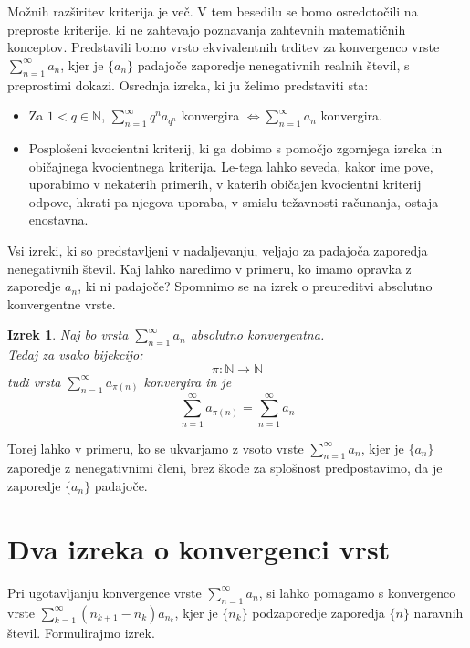 \documentclass[a4paper,12pt]{article}
\def\N{\mathbb{N}} %
\newtheorem{izrek}{Izrek}
\begin{document}
Možnih razširitev kriterija je več. V tem besedilu se bomo osredotočili na preproste kriterije, ki ne
zahtevajo poznavanja zahtevnih matematičnih konceptov. Predstavili bomo vrsto ekvivalentnih trditev
za konvergenco vrste $\sum_{n = 1}^{\infty}{a_n}$, kjer je $\{a_n\}$ padajoče zaporedje nenegativnih realnih števil, s preprostimi dokazi. Osrednja
izreka, ki ju želimo predstaviti sta:

\begin{itemize}
    \item Za $ 1 < q \in \N$, $\sum_{n = 1}^{\infty}{q^na_{q^n}}$ konvergira $\iff \sum_{n = 1}^{\infty}{a_{n}}$ konvergira.
    \item Posplošeni kvocientni kriterij, ki ga dobimo s pomočjo zgornjega izreka in običajnega kvocientnega kriterija.
    Le-tega lahko seveda, kakor ime pove, uporabimo v nekaterih primerih, v katerih običajen kvocientni kriterij odpove, 
    hkrati pa njegova uporaba, v smislu težavnosti računanja, ostaja enostavna.
\end{itemize}


Vsi izreki, ki so predstavljeni v nadaljevanju, veljajo za padajoča zaporedja nenegativnih števil.
Kaj lahko naredimo v primeru, ko imamo opravka z zaporedje $a_n$, ki ni padajoče?
Spomnimo se na izrek o preureditvi absolutno konvergentne vrste.

\begin{izrek}
    Naj bo vrsta $\sum_{n = 1}^{\infty}{a_n}$ absolutno konvergentna.\\
    Tedaj za vsako bijekcijo:
    \[\pi: \N \rightarrow \N \]
    tudi vrsta $\sum_{n = 1}^{\infty}{a_{\pi(n)}}$ konvergira in je 
    \[
        \sum_{n = 1}^{\infty}{a_{\pi(n)}} = \sum_{n = 1}^{\infty}{a_n}
    \]
\end{izrek}

Torej lahko v primeru, ko se ukvarjamo z vsoto vrste $\sum_{n = 1}^{\infty}{a_n}$, kjer je $\{a_n\}$ zaporedje z nenegativnimi členi, brez škode za splošnost predpostavimo, 
da je zaporedje $\{a_n\}$ padajoče. 

\section{Dva izreka o konvergenci vrst}
Pri ugotavljanju konvergence vrste $\sum_{n = 1}^{\infty}{a_n}$, si lahko pomagamo s konvergenco vrste
$\sum_{k = 1}^{\infty}{(n_{k+1} - n_k)a_{n_{k}}}$, kjer je $\{n_k\}$ podzaporedje zaporedja $\{n\}$ naravnih števil.
Formulirajmo izrek.
\end{document}
